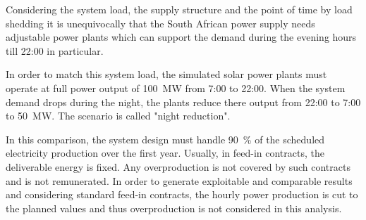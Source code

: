 Considering the system load, the supply structure and the point of time by load shedding it is unequivocally that the South African power supply needs adjustable power plants which can support the demand during the evening hours till 22:00 in particular. 

\pagebreak
In order to match this system load, the simulated solar power plants must operate at full power output of \SI{100}{MW} from 7:00 to 22:00. When the system demand drops during the night, the plants reduce there output from 22:00 to 7:00 to \SI{50}{MW}. The scenario is called "night reduction".

In this comparison, the system design must handle 90~\% of the scheduled electricity production over the first year. Usually, in feed-in contracts, the deliverable energy is fixed. Any overproduction is not covered by such contracts and is not remunerated. In order to generate exploitable and comparable results and considering standard feed-in contracts, the hourly power production is cut to the planned values and thus overproduction is not considered in this analysis.

